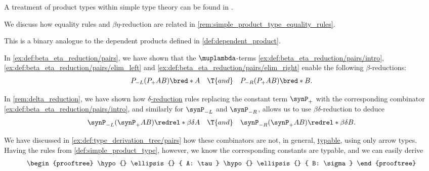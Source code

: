\begin{comments}
  \item A treatment of product types within simple type theory can be found in \cite[\S 4.3.1]{Mimram2020ProgramEqualsProof}.

  \item We discuss how equality rules and \( \beta\eta \)-reduction are related in \cref{rem:simple_product_type_equality_rules}.

  \item This is a binary analogue to the dependent products defined in \cref{def:dependent_product}.
\end{comments}

\begin{remark}\label{rem:simple_product_type_equality_rules}
  In \cref{ex:def:beta_eta_reduction/pairs}, we have shown that the \( \muplambda \)-terms \ref{ex:def:beta_eta_reduction/pairs/intro}, \ref{ex:def:beta_eta_reduction/pairs/elim_left} and \ref{ex:def:beta_eta_reduction/pairs/elim_right} enable the following \( \beta \)-reductions:
  \begin{align}\label{eq:rem:simple_product_type_equality_rules/beta}
    P_{-L} (P_+ A B) \bred* A
    &&
    \T{and}
    &&
    P_{-R} (P_+ A B) \bred* B.
  \end{align}

  In \cref{rem:delta_reduction}, we have shown how \hyperref[def:delta_reduction]{\( \delta \)-reduction} rules replacing the constant term \( \synP_+ \) with the corresponding combinator \ref{ex:def:beta_eta_reduction/pairs/intro}, and similarly for \( \synP_{-L} \) and \( \synP_{-R} \), allows us to use \( \beta\delta \)-reduction to deduce
  \begin{align*}
    \synP_{-L} (\synP_+ A B) \redrel*{\beta\delta} A
    &&
    \T{and}
    &&
    \synP_{-R} (\synP_+ A B) \redrel*{\beta\delta} B.
  \end{align*}

  We have discussed in \cref{ex:def:type_derivation_tree/pairs} how these combinators are not, in general, \hyperref[def:typability]{typable}, using only arrow types. Having the rules from \cref{def:simple_product_type}, however, we know the corresponding constants are typable, and we can easily derive
  \begin{equation*}
    \begin{prooftree}
      \hypo {}
      \ellipsis {} { A: \tau }

      \hypo {}
      \ellipsis {} { B: \sigma }


\end{prooftree}
\end{equation*}
\end{remark}
